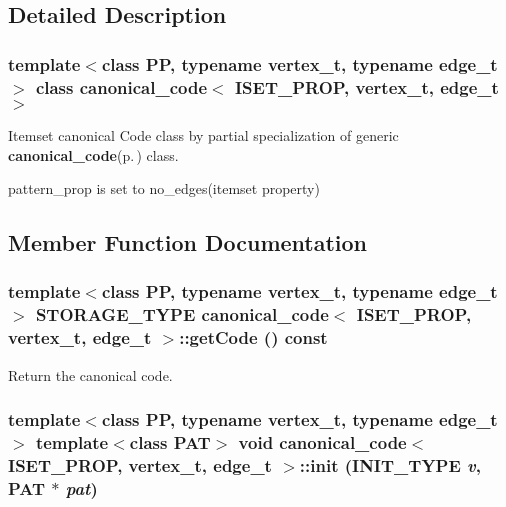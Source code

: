 \subsection{Detailed Description}
\subsubsection*{template$<$class PP, typename vertex\_\-t, typename edge\_\-t$>$ class canonical\_\-code$<$ ISET\_\-PROP, vertex\_\-t, edge\_\-t $>$}

Itemset canonical Code class by partial specialization of generic {\bf canonical\_\-code}{\rm (p.\,\pageref{classcanonical__code})} class. 

pattern\_\-prop is set to no\_\-edges(itemset property) 



\subsection{Member Function Documentation}
\subsubsection{\setlength{\rightskip}{0pt plus 5cm}template$<$class PP, typename vertex\_\-t, typename edge\_\-t$>$ STORAGE\_\-TYPE {\bf canonical\_\-code}$<$ ISET\_\-PROP, vertex\_\-t, edge\_\-t $>$::get\-Code () const\hspace{0.3cm}{\tt  [inline]}}\label{classcanonical__code_3_01ISET__PROP_00_01vertex__t_00_01edge__t_01_4_a3}


Return the canonical code. 
\subsubsection{\setlength{\rightskip}{0pt plus 5cm}template$<$class PP, typename vertex\_\-t, typename edge\_\-t$>$ template$<$class PAT$>$ void {\bf canonical\_\-code}$<$ ISET\_\-PROP, vertex\_\-t, edge\_\-t $>$::init (INIT\_\-TYPE {\em v}, PAT $\ast$ {\em pat})\hspace{0.3cm}{\tt  [inline]}}\label{classcanonical__code_3_01ISET__PROP_00_01vertex__t_00_01edge__t_01_4_a1}


